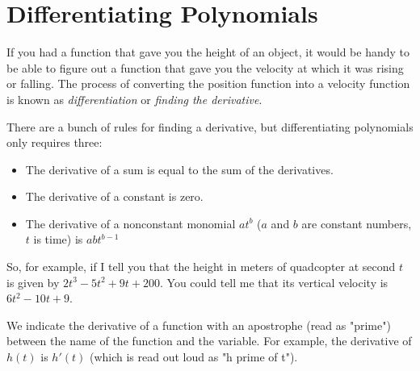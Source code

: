 \chapter{Differentiating Polynomials}

If you had a function that gave you the height of an object, it would
be handy to be able to figure out a function that gave you the
velocity at which it was rising or falling. The process of converting
the position function into a velocity function is known as
\emph{differentiation} or \emph{finding the derivative}.

There are a bunch of rules for finding a derivative, but
differentiating polynomials only requires three:
\begin{itemize}
\item The derivative of a sum is equal to the sum of the derivatives.
\item The derivative of a constant is zero.
\item The derivative of a nonconstant monomial $at^b$ ($a$ and $b$ are constant numbers, $t$ is time) is $abt^{b-1}$ 
\end{itemize}

So, for example, if I tell you that the height in meters of quadcopter
at second $t$ is given by $2t^3 - 5t^2 + 9t + 200$. You could tell me
that its vertical velocity is $6t^{2} - 10t + 9$.

We indicate the derivative of a function with an apostrophe (read as "prime") between the name of the function and the variable. For example, the derivative of $h(t)$ is $h'(t)$ (which is read out loud as "h prime of t"). 

